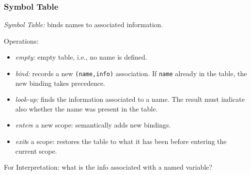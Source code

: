 \documentclass{beamer}
\renewcommand{\emph}[1]{\textcolor{structure}{#1}}
\newcommand{\emp}[1]{\textcolor{DikuRed}{ #1}}
\begin{document}
\begin{frame}[fragile,t]
   \frametitle{Symbol Table}

\emp{{\em Symbol Table:}} binds names to associated information.

\emp{Operations:}
\begin{itemize}
    \item \emph{\em empty:} empty table, i.e., no name is defined.\smallskip
    \item \emph{\em bind:} records a new {\tt (name,info)} association. If {\tt name}
        already in the table, the new binding takes precedence.\smallskip
    \item \emph{\em look-up:} finds the information associated to a name.
        The result must indicate also whether the name was present in the table.\smallskip
    \item \emph{\em enter}s a new scope: semantically adds new bindings.\smallskip
    \item \emph{\em exit}s a scope: restores the table to what it has been before
                    entering the current scope.
\end{itemize} 

\bigskip

\alert{For Interpretation: what is the info associated with a named variable?}

\end{frame}
\end{document}
